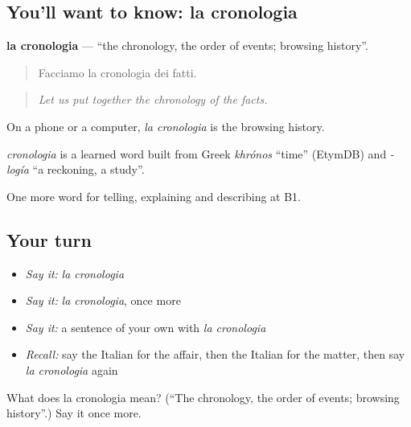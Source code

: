 \subsection*{You'll want to know: la cronologia}
\textbf{la cronologia} — \textquotedblleft{}the chronology, the order of events; browsing history\textquotedblright{}.

\begin{quote}
Facciamo la cronologia dei fatti.
\end{quote}

\begin{quote}
\emph{Let us put together the chronology of the facts.}
\end{quote}

On a phone or a computer, \emph{la cronologia} is the browsing history.

\begin{cousinweb}
\emph{cronologia} is a learned word built from Greek \emph{khrónos} \textquotedblleft{}time\textquotedblright{} (EtymDB) and \emph{-logía} \textquotedblleft{}a reckoning, a study\textquotedblright{}.
\end{cousinweb}

\begin{grammarlens}[title={What you've built}]
One more word for telling, explaining and describing at B1.
\end{grammarlens}

\subsection*{Your turn}
\begin{itemize}
\raggedright
  \item \emph{Say it:} \emph{la cronologia}
  \item \emph{Say it:} \emph{la cronologia}, once more
  \item \emph{Say it:} a sentence of your own with \emph{la cronologia}
  \item \emph{Recall:} say the Italian for the affair, then the Italian for the matter, then say \emph{la cronologia} again
\end{itemize}

\begin{tcolorbox}[breakable,colback=teal!4,colframe=teal!35!black,title={Before you move on}]
What does la cronologia mean? (\textquotedblleft{}The chronology, the order of events; browsing history\textquotedblright{}.) Say it once more.
\end{tcolorbox}
